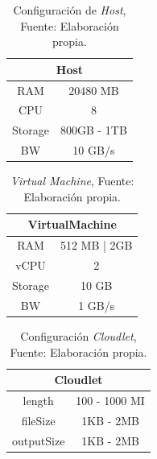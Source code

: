 \documentclass[jou,apacite]{apa6}
\begin{document}
\setcounter{table}{1}
\renewcommand\thetable{\arabic{table}}
\begin{table}[h!]
	\centering
	\begin{tabular}{@{}cc@{}}
		\toprule
		\multicolumn{2}{c}{{\bf Host}} \\ \midrule
		RAM           & 20480 MB        \\
		CPU           & 8              \\
		Storage       & 800GB - 1TB      \\ 
		BW            & 10 GB/s        
		\\ \bottomrule
	\end{tabular}
	\caption{Configuraci\'on de \textit{Host}, Fuente: Elaboraci\'on propia.}
	\label{tab:host}
\end{table}

\newpage

\setcounter{table}{2}
\renewcommand\thetable{\arabic{table}}
\begin{table}[h!]
	\centering
	\begin{tabular}{@{}cc@{}}
		\toprule
		\multicolumn{2}{c}{{\bf VirtualMachine}} \\ \midrule
		RAM               & 512 MB | 2GB          \\
		vCPU              & 2           \\
		Storage           & 10 GB                \\ 
		BW                & 1 GB/s    
		\\ \bottomrule          
	\end{tabular}
	\caption{\textit{Virtual Machine}, Fuente: Elaboraci\'on propia.}
	\label{tab:machine}
\end{table}


\setcounter{table}{3}
\renewcommand\thetable{\arabic{table}}
\begin{table}[h!]
	\centering
	\begin{tabular}{@{}cc@{}}
		\toprule
		\multicolumn{2}{c}{{\bf Cloudlet}} \\ \midrule
		length           & 100 - 1000 MI       \\
		fileSize     & 1KB - 2MB      \\
		outputSize           & 1KB - 2MB      \\ \midrule
	  
	\end{tabular}
	\caption{Configuraci\'on \textit{Cloudlet}, Fuente: Elaboraci\'on propia.}
	\label{tab:cloudlet}
\end{table}
\end{document}
